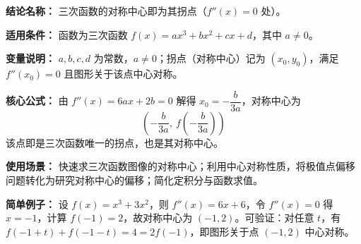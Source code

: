\textbf{结论名称：} 三次函数的对称中心即为其拐点（$f''(x)=0$ 处）。

\textbf{适用条件：} 函数为三次函数 $f(x)=ax^3+bx^2+cx+d$，其中 $a \neq 0$。

\textbf{变量说明：} $a,b,c,d$ 为常数，$a\neq 0$；拐点（对称中心）记为 $(x_0,y_0)$，满足 $f''(x_0)=0$ 且图形关于该点中心对称。

\textbf{核心公式：}
由 $f''(x)=6ax+2b=0$ 解得 $x_0=-\dfrac{b}{3a}$，对称中心为
\[
\boxed{\left(-\frac{b}{3a},\ f\!\left(-\frac{b}{3a}\right)\right)}
\]
该点即是三次函数唯一的拐点，也是其对称中心。

\textbf{使用场景：} 快速求三次函数图像的对称中心；利用中心对称性质，将极值点偏移问题转化为研究对称中心的偏移；简化定积分与函数求值。

\textbf{简单例子：} 设 $f(x)=x^3+3x^2$，则 $f''(x)=6x+6$，令 $f''(x)=0$ 得 $x=-1$，计算 $f(-1)=2$，故对称中心为 $(-1,2)$。可验证：对任意 $t$，有
$f(-1+t)+f(-1-t)=4=2f(-1)$，即图形关于点 $(-1,2)$ 中心对称。